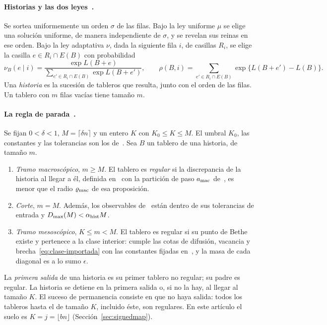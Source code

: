 \paragraph{Historias y las dos leyes~\cite[\S2]{tc}.} Se sortea uniformemente un orden \(\sigma\) de las
filas. Bajo la ley uniforme \(\mu\) se elige una solución uniforme, de manera independiente de
\(\sigma\), y se revelan sus reinas en ese orden. Bajo la ley adaptativa \(\nu\), dada la siguiente fila
\(i\), de casillas \(R_i\), se elige la casilla \(e\in R_i\cap E(B)\) con probabilidad
\[
 \nu_B(e\mid i)=\frac{\exp L(B+e)}{\sum_{e'\in R_i\cap E(B)}\exp L(B+e')},\qquad
 \rho(B,i)=\sum_{e'\in R_i\cap E(B)}\exp\{L(B+e')-L(B)\}.
\]
Una \emph{historia} es la sucesión de tableros que resulta, junto con el orden de las filas. Un tablero
con \(m\) filas vacías tiene tamaño \(m\).

\paragraph{La regla de parada~\cite[def.~2.2]{tc}.} Se fijan \(0<\delta<1\), \(M=\lceil\delta n\rceil\) y
un entero \(K\) con \(K_0\le K\le M\). El umbral \(K_0\), las constantes y las tolerancias son los
de~\cite[\S5.4]{tc}. Sea \(B\) un tablero de una historia, de tamaño \(m\).
\begin{enumerate}
\item[(a)] \emph{Tramo macroscópico}, \(m\ge M\). El tablero es \emph{regular} si la discrepancia de la
historia al llegar a él, definida en~\cite[\S4.2]{tc} con la partición de paso \(a_{\rm mac}\)
de~\cite[prop.~4.11]{tc}, es menor que el radio \(\varrho_{\rm mac}\) de esa proposición.
\item[(b)] \emph{Corte}, \(m=M\). Además, los observables de~\cite[\S5.3]{tc} están dentro de sus
tolerancias de entrada y \(D_{\max}(M)<\alpha_{\rm hist}M\).
\item[(c)] \emph{Tramo mesoscópico}, \(K\le m<M\). El tablero es regular si su punto de Bethe existe y
pertenece a la clase interior: cumple las cotas de difusión, vacancia y
brecha~\eqref{eq:clase-importada} con las constantes fijadas en~\cite[\S5.4]{tc}, y la masa de cada
diagonal es a lo sumo \(\epsilon\).
\end{enumerate}
La \emph{primera salida} de una historia es su primer tablero no regular; su padre es regular. La
historia se detiene en la primera salida o, si no la hay, al llegar al tamaño \(K\). El suceso de
permanencia consiste en que no haya salida: todos los tableros hasta el de tamaño \(K\), incluido éste,
son regulares. En este artículo el suelo es \(K=j=\lfloor bn\rfloor\) (Sección~\ref{sec:signedmap}).
